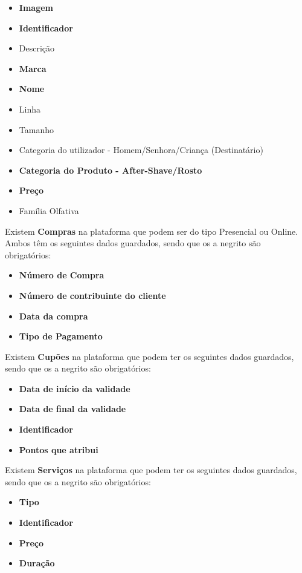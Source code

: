 \documentclass[10pt,portuguese]{article}
\begin{document}
\begin{itemize}
    \item \textbf{Imagem}
    \item \textbf{Identificador}
    \item Descrição
    \item \textbf{Marca}
     \item \textbf{Nome}
     \item Linha 
     \item Tamanho
     \item Categoria do utilizador - Homem/Senhora/Criança (Destinatário)
     \item \textbf{Categoria do Produto - After-Shave/Rosto}
     \item \textbf{Preço}
     \item Família Olfativa
\end{itemize}

\par Existem \textbf{Compras} na plataforma que podem ser do tipo Presencial ou Online. Ambos  têm os seguintes dados guardados, sendo que os a negrito são obrigatórios:

\begin{itemize}
    \item \textbf{Número de Compra}
    \item \textbf{Número de contribuinte do cliente}
    \item \textbf{Data da compra}
    \item \textbf{Tipo de Pagamento}
\end{itemize}

\par Existem \textbf{Cupões} na plataforma que podem ter os seguintes dados guardados, sendo que os a negrito são obrigatórios:

\begin{itemize}
    \item \textbf{Data de início da validade}
    \item \textbf{Data de final da validade}
    \item \textbf{Identificador}
    \item \textbf{Pontos que atribui}
\end{itemize}

\par Existem \textbf{Serviços} na plataforma que podem ter os seguintes dados guardados, sendo que os a negrito são obrigatórios:

\begin{itemize}
    \item \textbf{Tipo}
    \item \textbf{Identificador}
    \item \textbf{Preço}
    \item \textbf{Duração}
\end{itemize}
\end{document}
